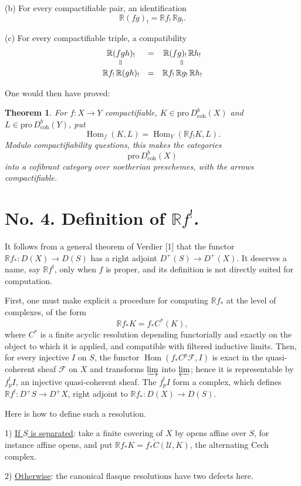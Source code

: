 \documentclass[12pt]{amsart}
\theoremstyle{plain}
\newtheorem{thm}{Theorem}
\theoremstyle{definition}
\DeclareMathOperator{\Hom}{Hom}
\newcommand{\Pro}{\text{pro}\,}
\newcommand{\coh}{\text{coh}}
\newcommand{\cF}{\mathcal{F}}
\newcommand{\cU}{\mathcal{U}}
\newcommand{\cDb}{D^{b}}
\newcommand{\cD}{D}
\newcommand{\bR}{\mathbb{R}}
\begin{document}
(b) For every compactifiable pair, an identification
\[
\bR(fg)_!=\bR f_!\,\bR g_!.
\]

(c) For every compactifiable triple, a compatibility
\[
\begin{array}{ccc}
\bR(fgh)_!&=&\bR(fg)_!\,\bR h_!\\
\rotatebox{90}{$=$}&&\rotatebox{90}{$=$}\\
\bR f_!\,\bR(gh)_!&=&\bR f_!\,\bR g_!\,\bR h_!
\end{array}
\]

One would then have proved:

\begin{thm}
For $f:X\to Y$ compactifiable, $K\in\Pro\cDb_{\coh}(X)$ and $L\in\Pro\cDb_{\coh}(Y)$, put
\[
\Hom_f(K,L)=\Hom_Y(\bR f_!K,L).
\]
Modulo compactifiability questions, this makes the categories
\[
\Pro\cDb_{\coh}(X)
\]
into a cofibrant category over noetherian preschemes, with the arrows compactifiable.
\end{thm}

\section*{No. 4. Definition of $\bR f^!$.}

It follows from a general theorem of Verdier [1] that the functor $\bR f_*:\cD(X)\to\cD(S)$ has a right adjoint $\cD^+(S)\to\cD^+(X)$. It deserves a name, say $\bR f^!$, only when $f$ is proper, and its definition is not directly suited for computation.

First, one must make explicit a procedure for computing $\bR f_*$ at the level of complexes, of the form
\[
\bR f_*K=f_*C^*(K),
\]
where $C^*$ is a finite acyclic resolution depending functorially and exactly on the object to which it is applied, and compatible with filtered inductive limits. Then, for every injective $I$ on $S$, the functor $\Hom(f_*C^p\cF,I)$ is exact in the quasi-coherent sheaf $\cF$ on $X$ and transforms $\varinjlim$ into $\varprojlim$; hence it is representable by $f_p^!I$, an injective quasi-coherent sheaf. The $f_p^!I$ form a complex, which defines $\bR f^!:\cD^+S\to\cD^+X$, right adjoint to $\bR f_*:\cD(X)\to\cD(S)$.

Here is how to define such a resolution.

1) \underline{If $S$ is separated}: take a finite covering of $X$ by opens affine over $S$, for instance affine opens, and put $\bR f_*K=f_*\check C(\cU,K)$, the alternating Cech complex.

2) \underline{Otherwise}: the canonical flasque resolutions have two defects here.
\end{document}
